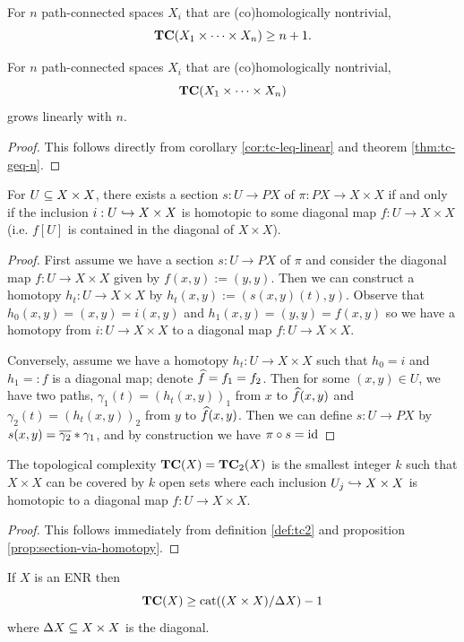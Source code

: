 \begin{theorem}\label{thm:tc-geq-n}
    For $n$ path-connected spaces $X_i$ that are (co)homologically nontrivial,
    \[
        \TC(X_1 \times \cdots \times X_n) \geq n+1.
    \]
\end{theorem}

\begin{corollary}
    For $n$ path-connected spaces $X_i$ that are (co)homologically nontrivial, \[
    \TC(X_1 \times \cdots \times X_n)
    \]
    grows linearly with $n$.
    \begin{proof}
        This follows directly from corollary \ref{cor:tc-leq-linear} and theorem \ref{thm:tc-geq-n}.
    \end{proof}
\end{corollary}

\begin{proposition}\label{prop:section-via-homotopy}
    For $U \sub X \times X$, there exists a section $s : U \to PX$ of $\pi : PX \to X \times X$ if and only if the inclusion $i : U \ito  X \times X$ is homotopic to some diagonal map $f : U \to X \times X$ (i.e. $f[U]$ is contained in the diagonal of $X \times X$).
    \begin{proof}
        First assume we have a section $s : U \to PX$ of $\pi$ and consider the diagonal map $f : U \to X \times X$ given by $f(x,y) := (y,y)$.
        Then we can construct a homotopy $h_t : U \to X \times X$ by $h_t(x,y) := (s(x,y)(t),y)$.
        Observe that $h_0(x,y) = (x,y) = i(x,y)$ and $h_1(x,y) = (y,y) = f(x,y)$ so we have a homotopy from $i : U \to X \times X$ to a diagonal map $f : U \to X \times X$.
        
        Conversely, assume we have a homotopy $h_t : U \to X \times X$ such that $h_0 = i$ and $h_1 =: f$ is a diagonal map; denote $\Hat{f} = f_1 = f_2$.
        Then for some $(x,y) \in U$, we have two paths, $\gamma_1(t) = (h_t(x,y))_1$ from $x$ to $\Hat{f}(x,y)$ and $\gamma_2(t) = (h_t(x,y))_2$ from $y$ to $\Hat{f}(x,y)$.
        Then we can define $s : U \to PX$ by $s(x,y) = \Bar{\gamma_2} \ast \gamma_1$, and by construction we have $\pi \circ s = \id$
    \end{proof}
\end{proposition}

\begin{corollary}
    The topological complexity $\TC(X) = \TC_2(X)$ is the smallest integer $k$ such that $X \times X$ can be covered by $k$ open sets where each inclusion $U_j \ito X \times X$ is homotopic to a diagonal map $f : U \to X \times X$.
    \begin{proof}
        This follows immediately from definition \ref{def:tc2} and proposition \ref{prop:section-via-homotopy}.
    \end{proof}
\end{corollary}

\begin{proposition}
    If $X$ is an ENR then
    \[
        \TC(X) \geq \cat((X \times X)/\Delta X) - 1
    \]
    where $\Delta X \sub X \times X$ is the diagonal.
\end{proposition}
